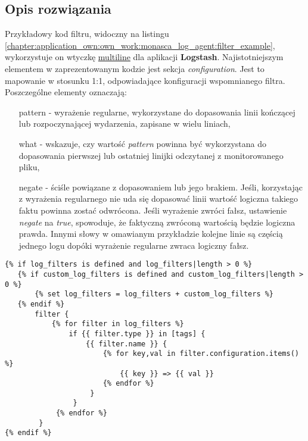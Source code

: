     \subsection{Opis rozwiązania}
    Przykładowy kod filtru, widoczny na listingu \ref{chapter:application_own:own_work:monasca_log_agent:filter_example}, 
    wykorzystuje on wtyczkę \href{https://www.elastic.co/guide/en/logstash/current/plugins-filters-multiline.html}{multiline} 
    dla aplikacji \textbf{Logstash}. Najistotniejszym elementem w zaprezentowanym kodzie jest sekcja 
    \textit{configuration}. Jest to mapowanie w stosunku 1:1, odpowiadające konfiguracji wspomnianego filtra. Poszczególne 
    elementy oznaczają:
    \begin{itemize}
        \item[pattern] - wyrażenie regularne, wykorzystane do dopasowania linii kończącej lub rozpoczynającej wydarzenia, zapisane w wielu liniach,
        \item[what] - wskazuje, czy wartość \textit{pattern} powinna być wykorzystana do dopasowania pierwszej lub ostatniej linijki odczytanej
        z monitorowanego pliku,
        \item[negate] - ściśle powiązane z dopasowaniem lub jego brakiem. Jeśli, korzystając z wyrażenia regularnego nie uda się dopasować linii
        wartość logiczna takiego faktu powinna zostać odwrócona. Jeśli wyrażenie zwróci fałsz, ustawienie \textit{negate} na \textit{true}, 
        spowoduje, że faktyczną zwróconą wartością będzie logiczna prawda. Innymi słowy w omawianym przykładzie kolejne linie są częścią jednego
        logu dopóki wyrażenie regularne zwraca logiczny fałsz. 
    \end{itemize}
    
    \begin{listing}[H]
        \begin{verbatim}
{% if log_filters is defined and log_filters|length > 0 %}
   {% if custom_log_filters is defined and custom_log_filters|length > 0 %}
       {% set log_filters = log_filters + custom_log_filters %}
   {% endif %}
       filter {
           {% for filter in log_filters %}
               if {{ filter.type }} in [tags] {
                   {{ filter.name }} {
                       {% for key,val in filter.configuration.items() %}
                           {{ key }} => {{ val }}
                       {% endfor %}
                    }
                }
            {% endfor %}
        }
{% endif %}
        \end{verbatim}
        \caption[Wpisanie filtrów do pliku konfiguracyjnego \textbf{Logstash}]{
            Wpisanie filtrów do pliku konfiguracyjnego \textbf{Logstash}, źródło: \url{https://github.com/FujitsuEnablingSoftwareTechnologyGmbH/ansible-monasca-log-agent/blob/master/templates/agent.conf.j2}}
        \label{chapter:application_own:own_work:monasca_log_agent:filter_applying}
    \end{listing}
    
